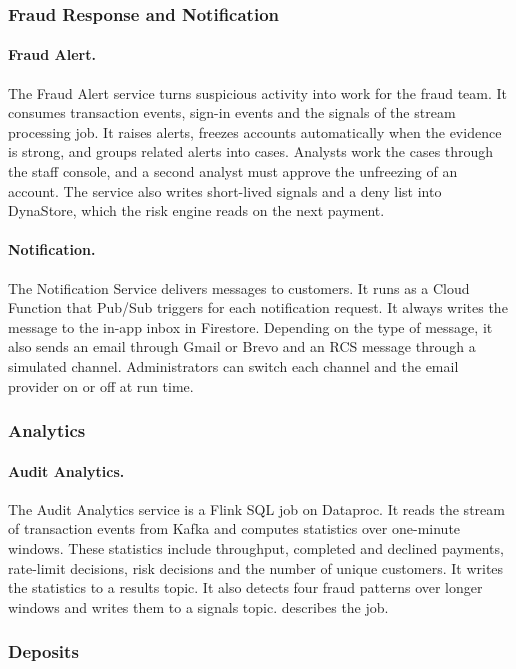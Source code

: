 \documentclass[11pt,a4paper]{article}
\begin{document}
\subsubsection{Fraud Response and Notification}

\paragraph{Fraud Alert.} The Fraud Alert service turns suspicious activity into work for the fraud team. It consumes transaction events, sign-in events and the signals of the stream processing job. It raises alerts, freezes accounts automatically when the evidence is strong, and groups related alerts into cases. Analysts work the cases through the staff console, and a second analyst must approve the unfreezing of an account. The service also writes short-lived signals and a deny list into DynaStore, which the risk engine reads on the next payment.

\paragraph{Notification.} The Notification Service delivers messages to customers. It runs as a Cloud Function that Pub/Sub triggers for each notification request. It always writes the message to the in-app inbox in Firestore. Depending on the type of message, it also sends an email through Gmail or Brevo and an RCS message through a simulated channel. Administrators can switch each channel and the email provider on or off at run time.

\subsubsection{Analytics}

\paragraph{Audit Analytics.} The Audit Analytics service is a Flink SQL job on Dataproc. It reads the stream of transaction events from Kafka and computes statistics over one-minute windows. These statistics include throughput, completed and declined payments, rate-limit decisions, risk decisions and the number of unique customers. It writes the statistics to a results topic. It also detects four fraud patterns over longer windows and writes them to a signals topic.  describes the job.

\subsubsection{Deposits}
\end{document}
